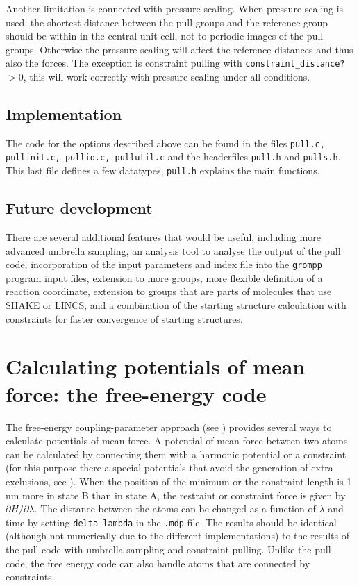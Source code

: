 Another limitation is connected with pressure scaling.
When pressure scaling is used, the shortest distance between the pull
groups and the reference group should be within in the central unit-cell,
not to periodic images of the pull groups.
Otherwise the pressure scaling will affect the reference distances
and thus also the forces.
The exception is constraint pulling with {\tt constraint\_distance?} $> 0$,
this will work correctly with pressure scaling under all conditions.

\subsection{Implementation}

The code for the options described above can be found in the files
{\tt pull.c, pullinit.c, pullio.c, pullutil.c} and the headerfiles
{\tt pull.h} and {\tt pulls.h}. This last file defines a few
datatypes, {\tt pull.h} explains the main functions. 

\subsection{Future development}
There are several additional features that would be useful, including
more advanced umbrella sampling, an analysis tool to analyse the
output of the pull code, incorporation of the input parameters and
index file into the {\tt grompp} program input files, extension to more
groups, more flexible definition of a reaction coordinate, extension
to groups that are parts of molecules that use SHAKE or LINCS, and a
combination of the starting structure calculation with constraints for
faster convergence of starting structures.

\section{Calculating potentials of mean force: the free-energy code}
\label{sec:fepmf}
The free-energy coupling-parameter approach (see )
provides several ways to calculate potentials of mean force.
A potential of mean force between two atoms can be calculated
by connecting them with a harmonic potential or a constraint
(for this purpose there a special potentials that avoid the generation of
extra exclusions, see ).
When the position of the minimum or the constraint length is 1 nm more
in state B than in state A, the restraint or constraint force is given
by $\partial H/\partial \lambda$.
The distance between the atoms can be changed as a function of $\lambda$
and time by setting {\tt delta-lambda} in the {\tt .mdp} file.
The results should be identical (although not numerically
due to the different implementations) to the results of the pull code
with umbrella sampling and constraint pulling.
Unlike the pull code, the free energy code can also handle atoms that
are connected by constraints.

